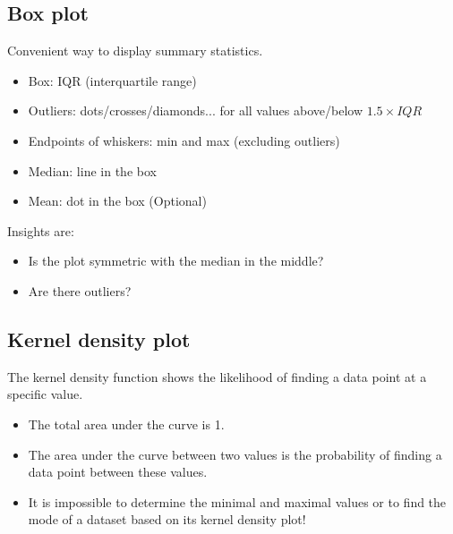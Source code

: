 \subsection{Box plot}
\begin{definition}
    Convenient way to display summary statistics.

    \begin{itemize}
        \item Box: IQR (interquartile range)
        \item Outliers: dots/crosses/diamonds... for all values above/below $1.5 \times IQR$
        \item Endpoints of whiskers: min and max (excluding outliers)
        \item Median: line in the box
        \item Mean: dot in the box (Optional)
    \end{itemize}

    Insights are:
    \begin{itemize}
        \item Is the plot symmetric with the median in the middle?
        \item Are there outliers?
    \end{itemize}

\end{definition}

\subsection{Kernel density plot}
\begin{definition}
    The kernel density function shows the likelihood of finding a data point at a specific value.

    \begin{itemize}
        \item The total area under the curve is 1.
        \item The area under the curve between two values is the probability of finding a data point between these values.
        \item It is impossible to determine the minimal and maximal values or to find the mode of a dataset based on its kernel density plot!
    \end{itemize}

\end{definition}

